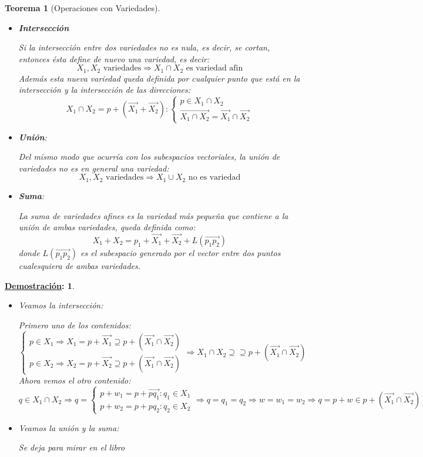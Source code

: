 \documentclass[10pt,a4paper,openright]{book}
\theoremstyle{break}
\newtheorem*{theo}{Teorema}
\newtheorem*{demo}{\underline{Demostración}:}
\begin{document}
\begin{theo}[Operaciones con Variedades]
\begin{itemize}
\item \textbf{Intersección}

Si la intersección entre dos variedades no es nula, es decir, se cortan, entonces ésta define de nuevo una variedad, es decir:
$$X_1, X_2\mbox{ variedades}\Rightarrow X_1\cap X_2\mbox{ es variedad afin}$$
Además esta nueva variedad queda definida por cualquier punto que está en la intersección y la intersección de las direcciones:
$$X_1\cap X_2 = p + (\vec{X_1}+\vec{X_2}): \begin{cases} p\in X_1\cap X_2 \\ \vec{X_1\cap X_2} = \vec{X_1} \cap  \vec{X_2}\end{cases}$$
\item \textbf{Unión}:

Del mismo modo que ocurría con los subespacios vectoriales, la unión de variedades no es en general una variedad:
$$X_1,X_2\mbox{ variedades} \Rightarrow X_1 \cup X_2 \mbox{ no es variedad}$$
\item \textbf{Suma}:

La suma de variedades afines es la variedad más pequeña que contiene a la unión de ambas variedades, queda definida como:
$$X_1+X_2 = p_1 + \vec{X_1} + \vec{X_2} + L(\vec{p_1p_2})$$
donde $L(\vec{p_1p_2})$ es el subespacio generado por el vector entre dos puntos cualesquiera de ambas variedades.
\end{itemize}
\end{theo}
\begin{demo}
\begin{itemize}
\item Veamos la intersección:

Primero uno de los contenidos:
$$\begin{cases} p\in X_1\Rightarrow X_1 = p+\vec{X_1} \supseteq p+(\vec{X_1} \cap  \vec{X_2})\\ p\in X_2\Rightarrow X_2 = p+\vec{X_2} \supseteq p+(\vec{X_1} \cap  \vec{X_2})\end{cases} \Rightarrow X_1 \cap X_2 \supseteq \supseteq p+(\vec{X_1} \cap  \vec{X_2})$$
Ahora vemos el otro contenido:
$$q\in X_1\cap X_2\Rightarrow q = \begin{cases} p+w_1= p+\vec{pq_1} : q_1\in X_1 \\ p+w_2 = p+ pq_2 : q_2\in X_2\end{cases} \Rightarrow q = q_1 = q_2 \Rightarrow w = w_1 = w_2\Rightarrow q = p + w \in p+(\vec{X_1} \cap  \vec{X_2})$$

\item Veamos la unión y la suma:

Se deja para mirar en el libro
\end{itemize}
\end{demo}
\end{document}
